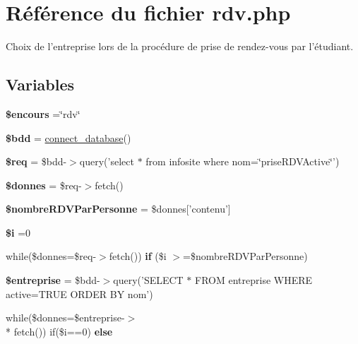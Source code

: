 \hypertarget{rdv_8php}{\section{Référence du fichier rdv.\-php}
\label{rdv_8php}
}


Choix de l'entreprise lors de la procédure de prise de rendez-\/vous par l'étudiant.  


\subsection*{Variables}
\begin{DoxyCompactItemize}
\item 
\hypertarget{rdv_8php_af7b0e56292699e6983c24fbbf70ce08d}{{\bfseries \$encours} =\char`\"{}rdv\char`\"{}}\label{rdv_8php_af7b0e56292699e6983c24fbbf70ce08d}

\item 
\hypertarget{rdv_8php_a94f91e878bce0991e2cd595c5dd79b3f}{{\bfseries \$bdd} = \hyperlink{function_8php_a1f56f7efe8c1222675d8715c259957d5}{connect\-\_\-database}()}\label{rdv_8php_a94f91e878bce0991e2cd595c5dd79b3f}

\item 
\hypertarget{rdv_8php_a63a7a283ea5dee8af1e2d5a3435bf370}{{\bfseries \$req} = \$bdd-\/$>$query('select $\ast$ from infosite where nom=\char`\"{}prise\-R\-D\-V\-Active\char`\"{}')}\label{rdv_8php_a63a7a283ea5dee8af1e2d5a3435bf370}

\item 
\hypertarget{rdv_8php_a93720f3d7a3eb4aabe4bb2053895b6b6}{{\bfseries \$donnes} = \$req-\/$>$fetch()}\label{rdv_8php_a93720f3d7a3eb4aabe4bb2053895b6b6}

\item 
\hypertarget{rdv_8php_aca8360b8df321ac8835d086335f18a12}{{\bfseries \$nombre\-R\-D\-V\-Par\-Personne} = \$donnes\mbox{[}'contenu'\mbox{]}}\label{rdv_8php_aca8360b8df321ac8835d086335f18a12}

\item 
\hypertarget{rdv_8php_a83018d9153d17d91fbcf3bc10158d34f}{{\bfseries \$i} =0}\label{rdv_8php_a83018d9153d17d91fbcf3bc10158d34f}

\item 
\hypertarget{rdv_8php_a14c4c4c77ecbb15064067e2fd1696b85}{while(\$donnes=\$req-\/$>$fetch()) {\bfseries if} (\$i $>$=\$nombre\-R\-D\-V\-Par\-Personne)}\label{rdv_8php_a14c4c4c77ecbb15064067e2fd1696b85}

\item 
\hypertarget{rdv_8php_a6d3423f147c69f4f47f014654a57fc93}{{\bfseries \$entreprise} = \$bdd-\/$>$query('S\-E\-L\-E\-C\-T $\ast$ F\-R\-O\-M entreprise W\-H\-E\-R\-E active=T\-R\-U\-E O\-R\-D\-E\-R B\-Y nom')}\label{rdv_8php_a6d3423f147c69f4f47f014654a57fc93}

\item 
while(\$donnes=\$entreprise-\/$>$\\*
fetch()) if(\$i==0) {\bfseries else}
\end{DoxyCompactItemize}


